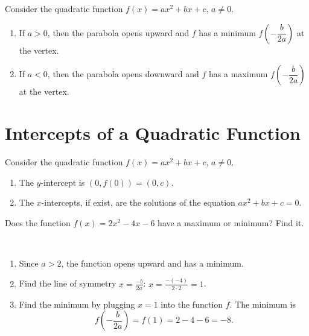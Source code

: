 \documentclass[en,11pt]{elegantbook}
\let\BeginKnitrBlock\begin \let\EndKnitrBlock\end
\begin{document}
Consider the quadratic function \(f(x)=ax^2+bx+c\), \(a\neq 0\).

\begin{enumerate}
\def\labelenumi{\arabic{enumi}.}

\item
  If \(a>0\), then the parabola opens upward and \(f\) has a minimum \(f\left(-\dfrac{b}{2a}\right)\) at the vertex.
\item
  If \(a<0\), then the parabola opens downward and \(f\) has a maximum \(f\left(-\dfrac{b}{2a}\right)\) at the vertex.
\end{enumerate}

\hypertarget{intercepts-of-a-quadratic-function}{%
\section{Intercepts of a Quadratic Function}\label{intercepts-of-a-quadratic-function}}

Consider the quadratic function \(f(x)=ax^2+bx+c\), \(a\neq 0\).

\begin{enumerate}
\def\labelenumi{\arabic{enumi}.}

\item
  The \(y\)-intercept is \((0, f(0))=(0, c)\).
\item
  The \(x\)-intercepts, if exist, are the solutions of the equation \(ax^2+bx+c=0\).
\end{enumerate}

\BeginKnitrBlock{example}
\protect\hypertarget{exm:unnamed-chunk-257}{}{\label{exm:unnamed-chunk-257} }
Does the function \(f(x)=2x^2-4x-6\) have a maximum or minimum? Find it.
\EndKnitrBlock{example}

\BeginKnitrBlock{solution}
{}\\

\begin{enumerate}
\def\labelenumi{\arabic{enumi}.}

\item
  Since \(a>2\), the function opens upward and has a minimum.
\item
  Find the line of symmetry \(x=\frac{-b}{2a}\):
  \(x=\frac{-(-4)}{2\cdot 2}=1\).
\item
  Find the minimum by plugging \(x=1\) into the function \(f\).
  The minimum is
  \[
   f(-\frac{b}{2a})=f(1)=2-4-6=-8.
   \]
\end{enumerate}
\EndKnitrBlock{solution}
\end{document}
